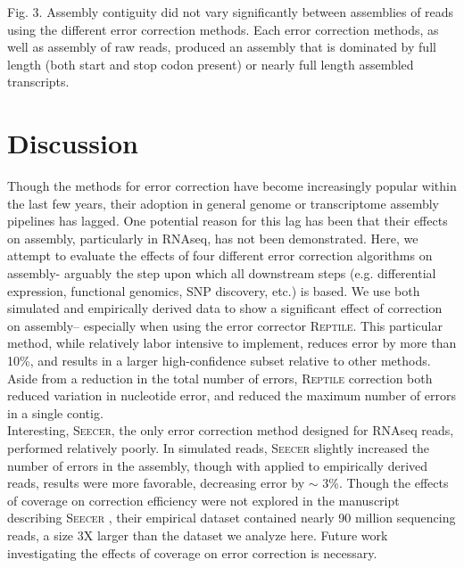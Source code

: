 \documentclass[11pt]{article}
\begin{document}
\noindent
\begin{changemargin}{2cm}{2cm}
Fig. 3. Assembly contiguity did not vary significantly between assemblies of reads using the different error correction methods. Each error correction methods, as well as assembly of raw reads, produced an assembly that is dominated by full length (both start and stop codon present) or nearly full length assembled transcripts. 
\end{changemargin}
\vspace{10mm}

\section*{Discussion}

Though the methods for error correction have become increasingly popular within the last few years, their adoption in general genome or transcriptome assembly pipelines has lagged. One potential reason for this lag has been that their effects on assembly, particularly in RNAseq, has not been demonstrated. Here, we attempt to evaluate the effects of four different error correction algorithms on assembly- arguably the step upon which all downstream steps (e.g. differential expression, functional genomics, SNP discovery, etc.) is based. We use both simulated and empirically derived data to show a significant effect of correction on assembly-- especially when using the error corrector \textsc{Reptile}. This particular method, while relatively labor intensive to implement, reduces error by more than 10\%, and results in a larger high-confidence subset relative to other methods.  Aside from a reduction in the total number of errors, \textsc{Reptile} correction both reduced variation in nucleotide error, and reduced the maximum number of errors in a single contig.   \\


\noindent
Interesting, \textsc{Seecer}, the only error correction method designed for RNAseq reads, performed relatively poorly. In simulated reads, \textsc{Seecer} slightly increased the number of errors in the assembly, though with applied to empirically derived reads, results were more favorable, decreasing error by $\sim$ 3\%.  Though the effects of coverage on correction efficiency were not explored in the manuscript describing \textsc{Seecer} \citep{Le:2013dy}, their empirical dataset contained nearly 90 million sequencing reads, a size 3X larger than the dataset we analyze here.  Future work investigating the effects of coverage on error correction is necessary.  \\
\end{document}
